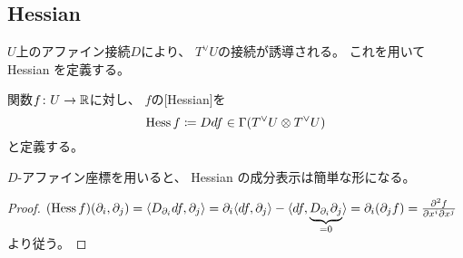 \documentclass[report]{jlreq}
\begin{document}
\subsection{Hessian}

$U$上のアファイン接続$D$により、
$T^\vee U$の接続が誘導される。
これを用いて Hessian を定義する。

\begin{definition}[Hessian]
    \smooth 関数$f \colon U \to \mathbb{R}$に対し、
    $f$の[Hessian]を
    \begin{equation}
        \operatorname{Hess} f \coloneqq Ddf
            \in \Gamma(T^\vee U \otimes T^\vee U)
    \end{equation}
    と定義する。
\end{definition}

$D$-アファイン座標を用いると、
Hessian の成分表示は簡単な形になる。


\begin{proof}
    $(\operatorname{Hess} f)(\partial_i, \partial_j)
        = \langle D_{\partial_i} df, \partial_j \rangle
        = \partial_i \langle df, \partial_j \rangle
            - \langle
                df,
                \underbrace{D_{\partial_i} \partial_j}_{= 0}
            \rangle
        = \partial_i (\partial_j f)
        = \frac{\partial^2 f}{\partial x^i \partial x^j}$
    より従う。
\end{proof}
\end{document}
